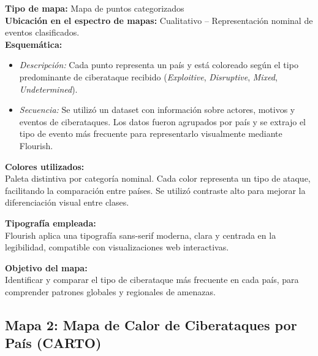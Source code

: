 \documentclass[12pt, a4paper]{article}
\begin{document}
\textbf{Tipo de mapa:} Mapa de puntos categorizados \\
\textbf{Ubicación en el espectro de mapas:} Cualitativo – Representación nominal de eventos clasificados. \\

\textbf{Esquemática:} \\
\begin{itemize}
    \item \textit{Descripción:} Cada punto representa un país y está coloreado según el tipo predominante de ciberataque recibido (\textit{Exploitive}, \textit{Disruptive}, \textit{Mixed}, \textit{Undetermined}).
    \item \textit{Secuencia:} Se utilizó un dataset con información sobre actores, motivos y eventos de ciberataques. Los datos fueron agrupados por país y se extrajo el tipo de evento más frecuente para representarlo visualmente mediante Flourish.
\end{itemize}

\textbf{Colores utilizados:} \\
Paleta distintiva por categoría nominal. Cada color representa un tipo de ataque, facilitando la comparación entre países. Se utilizó contraste alto para mejorar la diferenciación visual entre clases.

\textbf{Tipografía empleada:} \\
Flourish aplica una tipografía sans-serif moderna, clara y centrada en la legibilidad, compatible con visualizaciones web interactivas.

\textbf{Objetivo del mapa:} \\
Identificar y comparar el tipo de ciberataque más frecuente en cada país, para comprender patrones globales y regionales de amenazas.



\subsection*{Mapa 2: Mapa de Calor de Ciberataques por País (CARTO)}
\end{document}

